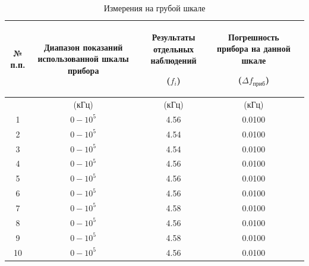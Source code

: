 \begin{center}
\begin{table}
\centering
\caption{Измерения на грубой шкале}
\label{tabl:1}
\begin{tabular}{|c|c|c|c|c|}
\hline
\begin{minipage}{7mm}
    № п.п. 
\end{minipage}&
\begin{minipage}{5cm}
\begin{center}
    Диапазон показаний использованной шкалы прибора
\end{center}
\end{minipage} &
\begin{minipage}{5cm}
\begin{center}
    Результаты отдельных наблюдений
    
    ($f_i$)
\end{center}
\end{minipage} &
\begin{minipage}{5cm}
\begin{center}
    Погрешность прибора на данной шкале
    
    ($\Delta f_{приб}$)
\end{center}
\end{minipage}\\
\hline
{}&(кГц)&(кГц)&(кГц)\\
\hline
1  & $0-10^5$  &  4.56  &  0.0100 \\
2  & $0-10^5$  &  4.54  &  0.0100 \\
3  & $0-10^5$  &  4.54  &  0.0100 \\
4  & $0-10^5$  &  4.56  &  0.0100 \\
5  & $0-10^5$  &  4.56  &  0.0100 \\
6  & $0-10^5$  &  4.56  &  0.0100 \\
7  & $0-10^5$   &  4.58  &  0.0100 \\
8  & $0-10^5$   &  4.56  &  0.0100 \\
9  & $0-10^5$   &  4.58  &  0.0100 \\
10 & $0-10^5$   &  4.56  &  0.0100 \\
\hline
\end{tabular}
\end{table}
\end{center}

